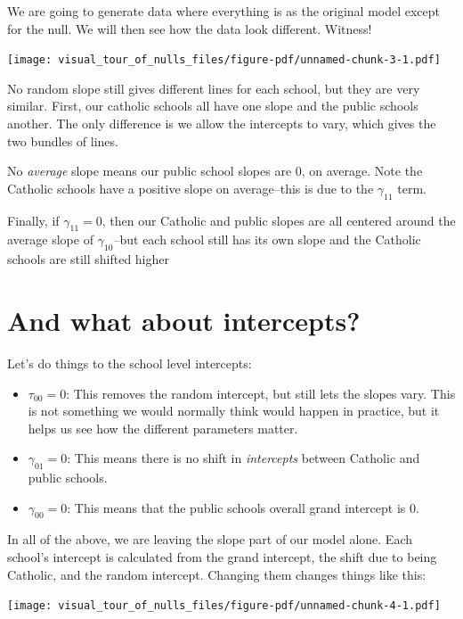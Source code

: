\documentclass[
  letterpaper,
  DIV=11,
  numbers=noendperiod]{scrreprt}
\providecommand{\tightlist}{%
  \setlength{\itemsep}{0pt}\setlength{\parskip}{0pt}}\usepackage{longtable,booktabs,array}
\begin{document}
We are going to generate data where everything is as the original model
except for the null. We will then see how the data look different.
Witness!

\begin{center}
\texttt{[image: visual\_tour\_of\_nulls\_files/figure-pdf/unnamed-chunk-3-1.pdf]}
\end{center}

No random slope still gives different lines for each school, but they
are very similar. First, our catholic schools all have one slope and the
public schools another. The only difference is we allow the intercepts
to vary, which gives the two bundles of lines.

No \emph{average} slope means our public school slopes are 0, on
average. Note the Catholic schools have a positive slope on
average--this is due to the \(\gamma_{11}\) term.

Finally, if \(\gamma_{11} = 0\), then our Catholic and public slopes are
all centered around the average slope of \(\gamma_{10}\)--but each
school still has its own slope and the Catholic schools are still
shifted higher

\section{And what about intercepts?}\label{and-what-about-intercepts}

Let's do things to the school level intercepts:

\begin{itemize}
\tightlist
\item
  \(\tau_{00} = 0\): This removes the random intercept, but still lets
  the slopes vary. This is not something we would normally think would
  happen in practice, but it helps us see how the different parameters
  matter.
\item
  \(\gamma_{01} = 0\): This means there is no shift in \emph{intercepts}
  between Catholic and public schools.
\item
  \(\gamma_{00} = 0\): This means that the public schools overall grand
  intercept is 0.
\end{itemize}

In all of the above, we are leaving the slope part of our model alone.
Each school's intercept is calculated from the grand intercept, the
shift due to being Catholic, and the random intercept. Changing them
changes things like this:

\begin{center}
\texttt{[image: visual\_tour\_of\_nulls\_files/figure-pdf/unnamed-chunk-4-1.pdf]}
\end{center}
\end{document}
